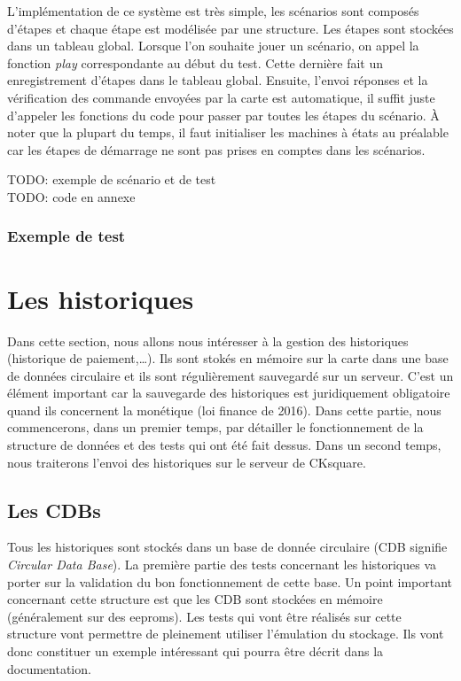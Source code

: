 \documentclass[a4paper]{article}
\begin{document}
L'implémentation de ce système est très simple, les scénarios sont composés
d'étapes et chaque étape est modélisée par une structure. Les étapes sont
stockées dans un tableau global. Lorsque l'on souhaite jouer un scénario, on
appel la fonction \textit{play} correspondante au début du test. Cette dernière
fait un enregistrement d'étapes dans le tableau global. Ensuite, l'envoi
réponses et la vérification des commande envoyées par la carte est automatique,
il suffit juste d'appeler les fonctions du code pour passer par toutes les
étapes du scénario. À noter que la plupart du temps, il faut initialiser les
machines à états au préalable car les étapes de démarrage ne sont pas prises en
comptes dans les scénarios.

TODO: exemple de scénario et de test\\
TODO: code en annexe

\subsubsection{Exemple de test}
\section{Les historiques}%

Dans cette section, nous allons nous intéresser à la gestion des historiques
(historique de paiement,\dots). Ils sont stokés en mémoire sur la carte dans
une base de données circulaire et ils sont régulièrement sauvegardé sur un
serveur. C'est un élément important car la sauvegarde des historiques est
juridiquement obligatoire quand ils concernent la monétique (loi finance de
2016). Dans cette partie, nous commencerons, dans un premier temps, par
détailler le fonctionnement de la structure de données et des tests qui ont
été fait dessus. Dans un second temps, nous traiterons l'envoi des
historiques sur le serveur de CKsquare.

\subsection{Les CDBs}
\label{cdbs}

Tous les historiques sont stockés dans un base de donnée circulaire (CDB
signifie \textit{Circular Data Base}). La première partie des tests concernant
les historiques va porter sur la validation du bon fonctionnement de cette base.
Un point important concernant cette structure est que les CDB sont stockées en
mémoire (généralement sur des eeproms). Les tests qui vont être réalisés sur
cette structure vont permettre de pleinement utiliser l'émulation du stockage.
Ils vont donc constituer un exemple intéressant qui pourra être décrit dans la
documentation.\\
\end{document}
